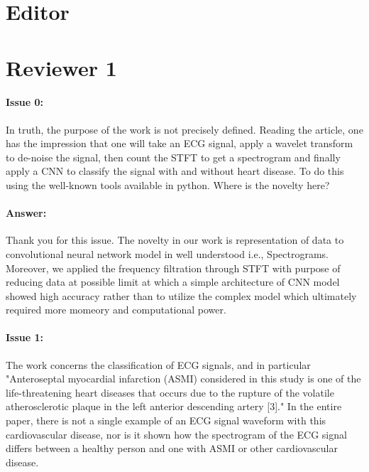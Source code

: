 \documentclass{article}
\begin{document}
\section{Editor}

\section{Reviewer 1}

\paragraph{Issue 0:}
\begin{displayquote}
In truth, the purpose of the work is not precisely defined. Reading the article, one has the impression that one will take an ECG signal, apply a wavelet transform to de-noise the signal, then count the STFT to get a spectrogram and finally apply a CNN to classify the signal with and without heart disease. To do this using the well-known tools available in python. Where is the novelty here?
\end{displayquote}

\paragraph{Answer:}
Thank you for this issue. The novelty in our work is representation of data to convolutional neural network model in well understood i.e., Spectrograms. Moreover, we applied the frequency filtration through STFT with purpose of reducing data at possible limit at which a simple architecture of CNN model showed high accuracy rather than to utilize the complex model which ultimately required more momeory and computational power. 

\paragraph{Issue 1:}
\begin{displayquote}
The work concerns the classification of ECG signals, and in particular "Anteroseptal myocardial infarction (ASMI) considered in this study is one of the life-threatening heart diseases that occurs due to the rupture of the volatile atherosclerotic plaque in the left anterior descending artery [3]." In the entire paper, there is not a single example of an ECG signal waveform with this cardiovascular disease, nor is it shown how the spectrogram of the ECG signal differs between a healthy person and one with ASMI or other cardiovascular disease. 
\end{displayquote}
\end{document}
